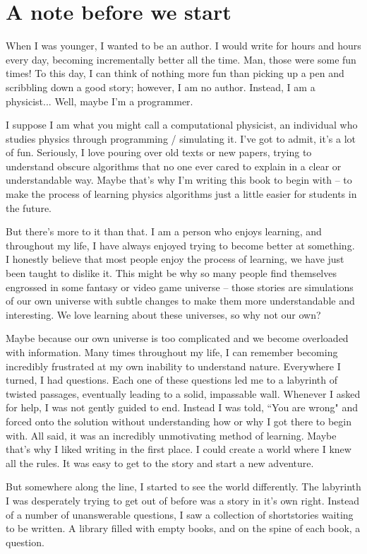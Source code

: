 \chapter{A note before we start}

When I was younger, I wanted to be an author. 
I would write for hours and hours every day, becoming incrementally better all the time. 
Man, those were some fun times! 
To this day, I can think of nothing more fun than picking up a pen and scribbling down a good story; however, I am no author.
Instead, I am a physicist... Well, maybe I'm a programmer. 

I suppose I am what you might call a computational physicist, an individual who studies physics through programming / simulating it.
I've got to admit, it's a lot of fun. 
Seriously, I love pouring over old texts or new papers, trying to understand obscure algorithms that no one ever cared to explain in a clear or understandable way. 
Maybe that's why I'm writing this book to begin with -- to make the process of learning physics algorithms just a little easier for students in the future.

But there's more to it than that. 
I am a person who enjoys learning, and throughout my life, I have always enjoyed trying to become better at something.
I honestly believe that most people enjoy the process of learning, we have just been taught to dislike it.
This might be why so many people find themselves engrossed in some fantasy or video game universe -- those stories are simulations of our own universe with subtle changes to make them more understandable and interesting.
We love learning about these universes, so why not our own?

Maybe because our own universe is too complicated and we become overloaded with information. 
Many times throughout my life, I can remember becoming incredibly frustrated at my own inability to understand nature.
Everywhere I turned, I had questions. 
Each one of these questions led me to a labyrinth of twisted passages, eventually leading to a solid, impassable wall.
Whenever I asked for help, I was not gently guided to end.
Instead I was told, ``You are wrong" and forced onto the solution without understanding how or why I got there to begin with. 
All said, it was an incredibly unmotivating method of learning.
Maybe that's why I liked writing in the first place. 
I could create a world where I knew all the rules. 
It was easy to get to the story and start a new adventure.

But somewhere along the line, I started to see the world differently. 
The labyrinth I was desperately trying to get out of before was a story in it's own right.
Instead of a number of unanswerable questions, I saw a collection of shortstories waiting to be written.
A library filled with empty books, and on the spine of each book, a question.

